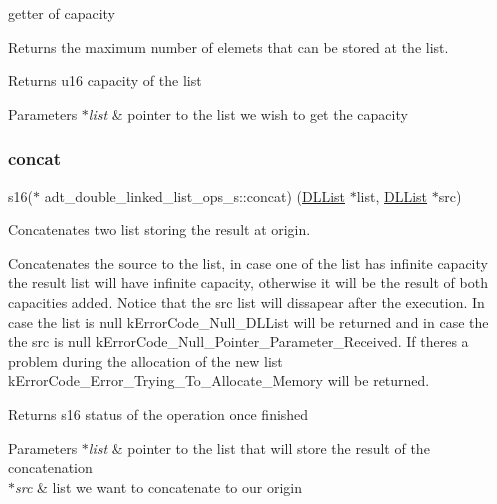 getter of capacity 

Returns the maximum number of elemets that can be stored at the list.

\begin{DoxyReturn}{Returns}
u16 capacity of the list 
\end{DoxyReturn}

\begin{DoxyParams}{Parameters}
{\em $\ast$list} & pointer to the list we wish to get the capacity \\
\hline
\end{DoxyParams}
\mbox{\label{structadt__double__linked__list__ops__s_ae893719dce808aae2f25c51be6f1c11a}} 
\subsubsection{\texorpdfstring{concat}{concat}}
{\footnotesize\ttfamily s16($\ast$ adt\+\_\+double\+\_\+linked\+\_\+list\+\_\+ops\+\_\+s\+::concat) (\hyperlink{structadt__double__linked__list__s}{D\+L\+List} $\ast$list, \hyperlink{structadt__double__linked__list__s}{D\+L\+List} $\ast$src)}



Concatenates two list storing the result at origin. 

Concatenates the source to the list, in case one of the list has infinite capacity the result list will have infinite capacity, otherwise it will be the result of both capacities added. Notice that the src list will dissapear after the execution. In case the list is null k\+Error\+Code\+\_\+\+Null\+\_\+\+D\+L\+List will be returned and in case the the src is null k\+Error\+Code\+\_\+\+Null\+\_\+\+Pointer\+\_\+\+Parameter\+\_\+\+Received. If there\textquotesingle{}s a problem during the allocation of the new list k\+Error\+Code\+\_\+\+Error\+\_\+\+Trying\+\_\+\+To\+\_\+\+Allocate\+\_\+\+Memory will be returned.

\begin{DoxyReturn}{Returns}
s16 status of the operation once finished 
\end{DoxyReturn}

\begin{DoxyParams}{Parameters}
{\em $\ast$list} & pointer to the list that will store the result of the concatenation \\
\hline
{\em $\ast$src} & list we want to concatenate to our origin \\
\hline
\end{DoxyParams}
\mbox{\label{structadt__double__linked__list__ops__s_a6a421e311614328c17b11404bbfcc0c1}} 
